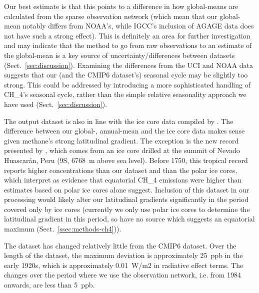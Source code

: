 Our best estimate is that this points to a difference in how global-means are calculated from the sparse observation network
(which mean that our global-mean notably differs from NOAA's,
while IGCC's inclusion of AGAGE data does not have such a strong effect).
This is definitely an area for further investigation
and may indicate that the method to go from raw observations to an estimate of the global-mean
is a key source of uncertainty/differences between datasets (Sect.~\ref{sec:discussion}).
Examining the differences from the UCI and NOAA data suggests
that our (and the CMIP6 dataset's) seasonal cycle may be slightly too strong.
This could be addressed by introducing a more sophisticated handling of CH_4's seasonal cycle,
rather than the simple relative seasonality approach we have used (Sect.~\ref{sec:discussion}).

The output dataset is also in line with the ice core data compiled by \citet{lamantia_tropical-ch4_2026}
\citep[which also includes the records of][]{mitchell_ch4-constraints_2013,rubino_law-dome-records_2019,rhodes_neem-ch4_2013}.
The difference between our global-, annual-mean and the ice core data makes sense
given methane's strong latitudinal gradient.
The exception is the new record presented by \citet{lamantia_tropical-ch4_2026},
which comes from an ice core drilled at the summit of Nevado Huascar\'an, Peru (9\textdegree S, 6768~m above sea level).
Before 1750, this tropical record reports higher concentrations than our dataset and than the polar ice cores,
which \citet{lamantia_tropical-ch4_2026} interpret as evidence that
equatorial CH_4 emissions were higher than estimates based on polar ice cores alone suggest.
Inclusion of this dataset in our processing would likely alter our latitudinal gradients significantly
in the period covered only by ice cores
(currently we only use polar ice cores to determine the latitudinal gradient in this period,
so have no source which suggests an equatorial maximum (Sect.~\ref{ssec:methods-ch4})).

The dataset has changed relatively little from the CMIP6 dataset.
Over the length of the dataset, the maximum deviation is approximately 25~ppb in the early 1920s,
which is approximately 0.01~W/m2 in radiative effect terms.
The changes over the period where we use the observation network, i.e. from 1984 onwards, are less than 5~ppb.

